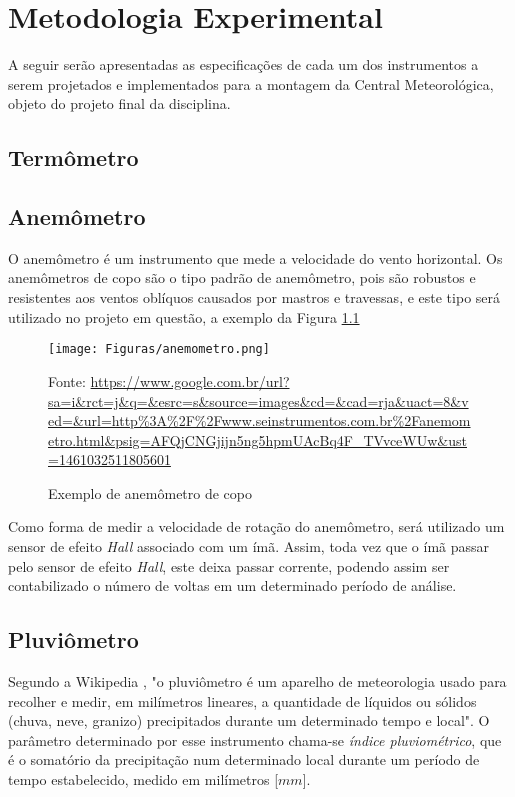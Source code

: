\documentclass[12pt,a4paper]{instrumentacao}
\begin{document}
\chapter{Metodologia Experimental}
A seguir serão apresentadas as especificações de cada um dos instrumentos a serem projetados e implementados para a montagem da Central Meteorológica, objeto do projeto final da disciplina.

\section{Termômetro}


\section{Anemômetro}
O anemômetro é um instrumento que mede a velocidade do vento horizontal. Os anemômetros de copo são o tipo padrão de anemômetro, pois são robustos e resistentes aos ventos oblíquos causados por mastros e travessas, e este tipo será utilizado no projeto em questão, a exemplo da Figura \ref{fig:anemometro}

\begin{figure}[h]
	\centering
		\texttt{[image: Figuras/anemometro.png]}
	\caption{Exemplo de anemômetro de copo}
	Fonte: \url{https://www.google.com.br/url?sa=i&rct=j&q=&esrc=s&source=images&cd=&cad=rja&uact=8&ved=&url=http%3A%2F%2Fwww.seinstrumentos.com.br%2Fanemometro.html&psig=AFQjCNGjijn5ng5hpmUAcBq4F_TVvceWUw&ust=1461032511805601}
	\label{fig:anemometro}
\end{figure}

Como forma de medir a velocidade de rotação do anemômetro, será utilizado um sensor de efeito \textit{Hall} associado com um ímã. Assim, toda vez que o ímã passar pelo sensor de efeito \textit{Hall}, este deixa passar corrente, podendo assim ser contabilizado o número de voltas em um determinado período de análise.


\section{Pluviômetro}

Segundo a Wikipedia \cite{pluviometro}, "o pluviômetro é um aparelho de meteorologia usado para recolher e medir, em milímetros lineares, a quantidade de líquidos ou sólidos (chuva, neve, granizo) precipitados durante um determinado tempo e local". O parâmetro determinado por esse instrumento chama-se \textit{índice pluviométrico}, que é o somatório da precipitação num determinado local durante um período de tempo estabelecido, medido em milímetros [$mm$].
\end{document}
